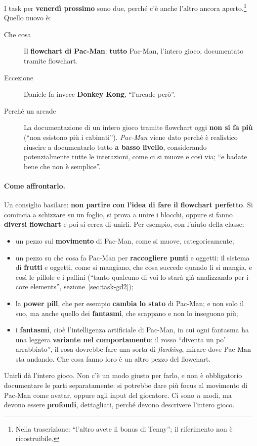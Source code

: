 I task per \textbf{venerdì prossimo} sono due, perché c'è anche l'altro
ancora aperto.\footnote{Nella trascrizione: ``l'altro avete il bonus di
Tenny''; il riferimento non è ricostruibile.} Quello nuovo è:

\begin{description}
  \item[Che cosa] Il \textbf{flowchart di Pac-Man}: \textbf{tutto} Pac-Man,
        l'intero gioco, documentato tramite flowchart.
  \item[Eccezione] Daniele fa invece \textbf{Donkey Kong}, ``l'arcade però''.
  \item[Perché un arcade] La documentazione di un intero gioco tramite
        flowchart oggi \textbf{non si fa più} (``non esistono più i
        cabinati''). \emph{Pac-Man} viene dato perché è realistico riuscire a
        documentarlo tutto \textbf{a basso livello}, considerando
        potenzialmente tutte le interazioni, come ci si muove e così via;
        ``e badate bene che non è semplice''.
\end{description}

\paragraph{Come affrontarlo.} Un consiglio basilare: \textbf{non partire con
l'idea di fare il flowchart perfetto}. Si comincia a schizzare su un foglio,
si prova a unire i blocchi, oppure si fanno \textbf{diversi flowchart} e poi
si cerca di unirli. Per esempio, con l'aiuto della classe:
\begin{itemize}
  \item un pezzo sul \textbf{movimento} di Pac-Man, come si muove,
        categoricamente;
  \item un pezzo su che cosa fa Pac-Man per \textbf{raccogliere punti} e
        oggetti: il sistema di \textbf{frutti} e oggetti, come si mangiano,
        che cosa succede quando li si mangia, e così le pillole e i pallini
        (``tanto qualcuno di voi lo starà già analizzando per i core
        elements'', sezione~\ref{sec:task-gd2});
  \item la \textbf{power pill}, che per esempio \textbf{cambia lo stato} di
        Pac-Man; e non solo il suo, ma anche quello dei \textbf{fantasmi},
        che scappano e non lo inseguono più;
  \item i \textbf{fantasmi}, cioè l'intelligenza artificiale di Pac-Man, in
        cui ogni fantasma ha una leggera \textbf{variante nel comportamento}:
        il rosso ``diventa un po' arrabbiato'', il rosa dovrebbe fare una
        sorta di \emph{flanking}, mirare dove Pac-Man sta andando. Che cosa
        fanno loro è un altro pezzo del flowchart.
\end{itemize}
Unirli dà l'intero gioco. Non c'è un modo giusto per farlo, e non è
obbligatorio documentare le parti separatamente: si potrebbe dare più focus
al movimento di Pac-Man come avatar, oppure agli input del giocatore. Ci sono
$n$ modi, ma devono essere \textbf{profondi}, dettagliati, perché devono
descrivere l'intero gioco.

